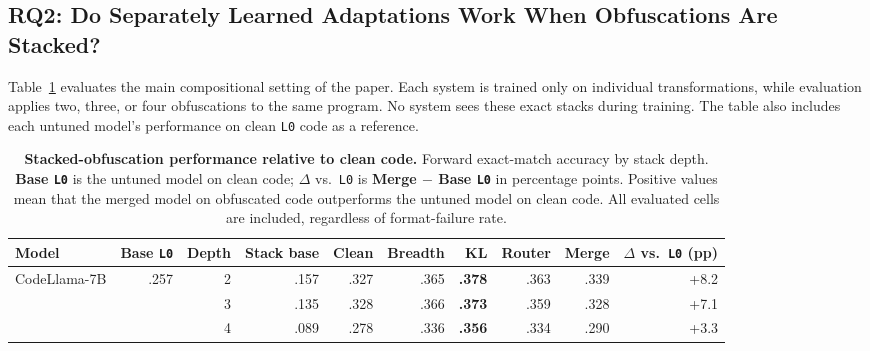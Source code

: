 \subsection{RQ2: Do Separately Learned Adaptations Work When Obfuscations
Are Stacked?}
\label{sec:rq2}

Table~\ref{tab:rq2_depth} evaluates the main compositional setting of the
paper. Each system is trained only on individual transformations, while
evaluation applies two, three, or four obfuscations to the same program.
No system sees these exact stacks during training. The table also includes
each untuned model's performance on clean \texttt{L0} code as a reference.
\begin{table}[!t]
\centering
\scriptsize
\setlength{\tabcolsep}{2.7pt}
\renewcommand{\arraystretch}{0.95}

\caption{\textbf{Stacked-obfuscation performance relative to clean code.}
Forward exact-match accuracy by stack depth. \textbf{Base \texttt{L0}} is the
untuned model on clean code; $\Delta$ vs.\ \texttt{L0} is
\textbf{Merge $-$ Base \texttt{L0}} in percentage points. Positive values mean
that the merged model on obfuscated code outperforms the untuned model on clean
code. All evaluated cells are included, regardless of format-failure rate.}
\label{tab:rq2_depth}

\begin{tabular}{@{}lrrrrrrrrr@{}}
\toprule
\textbf{Model} &
\textbf{Base \texttt{L0}} &
\textbf{Depth} &
\textbf{Stack base} &
\textbf{Clean} &
\textbf{Breadth} &
\textbf{KL} &
\textbf{Router} &
\textbf{Merge} &
\textbf{$\Delta$ vs.\ \texttt{L0} (pp)} \\
\midrule

CodeLlama-7B
& .257
& 2
& .157
& \textcolor{green!55!black}{.327}
& \textcolor{green!55!black}{.365}
& \textbf{\textcolor{green!55!black}{.378}}
& \textcolor{green!55!black}{.363}
& \textcolor{green!55!black}{.339}
& \textcolor{green!55!black}{+8.2} \\
&
& 3
& .135
& \textcolor{green!55!black}{.328}
& \textcolor{green!55!black}{.366}
& \textbf{\textcolor{green!55!black}{.373}}
& \textcolor{green!55!black}{.359}
& \textcolor{green!55!black}{.328}
& \textcolor{green!55!black}{+7.1} \\
&
& 4
& .089
& \textcolor{green!55!black}{.278}
& \textcolor{green!55!black}{.336}
& \textbf{\textcolor{green!55!black}{.356}}
& \textcolor{green!55!black}{.334}
& \textcolor{green!55!black}{.290}
& \textcolor{green!55!black}{+3.3} \\


\end{tabular}
\end{table}
